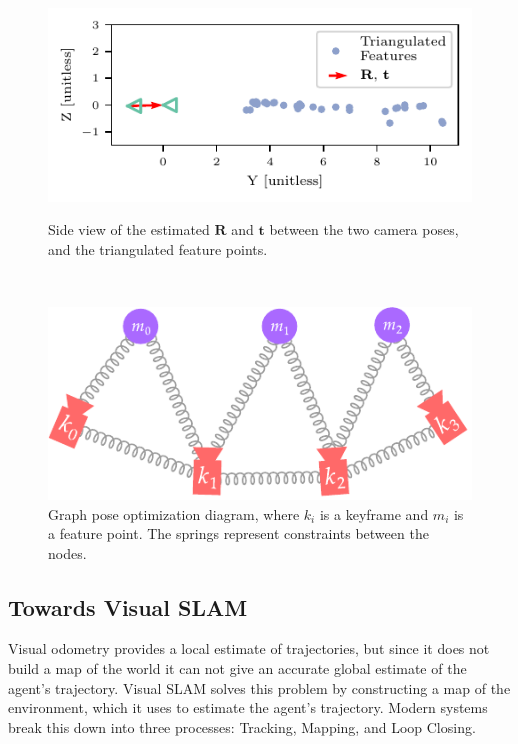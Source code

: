 \begin{figure}[h]
    \centering
    \captionsetup{format=plain}
    \begin{minipage}[t]{0.475\textwidth}
        \centering
        \includegraphics[width=\textwidth]{figures/3d_reconstruction.pdf}
        \caption{Side view of the estimated $\mathbf{R}$ and $\mathbf{t}$ between the two camera poses, and the triangulated feature points.}
        \label{fig:vo-3d-reconstruction}
    \end{minipage}\hfill%
    ~
    \begin{minipage}[t]{0.475\textwidth}
        \centering
        \includegraphics[width=\textwidth]{figures/gpo_diagram.pdf}
        \caption{Graph pose optimization diagram, where $k_i$ is a keyframe and $m_i$ is a feature point. The springs represent constraints between the nodes.}
        \label{fig:gpo-diagram}
    \end{minipage}%
\end{figure}

\subsection{Towards Visual SLAM}
\label{sec:towards-visual-slam}
Visual odometry provides a local estimate of trajectories, but since it does not build a map of the world it can not give an accurate global estimate of the agent's trajectory. Visual SLAM solves this problem by constructing a map of the environment, which it uses to estimate the agent's trajectory. Modern systems break this down into three processes: Tracking, Mapping, and Loop Closing.

